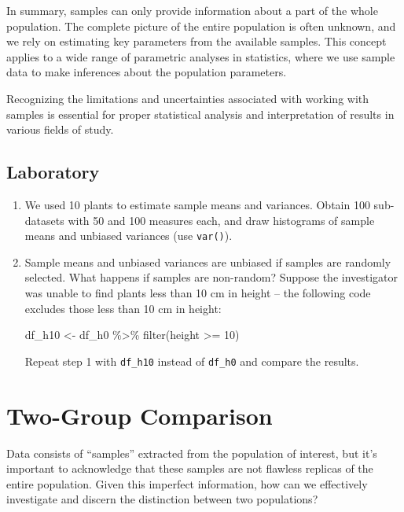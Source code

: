 \documentclass[
]{book}
\newenvironment{Shaded}{\begin{snugshade}}{\end{snugshade}}
\newcommand{\DecValTok}[1]{\textcolor[rgb]{0.00,0.00,0.81}{#1}}
\newcommand{\FunctionTok}[1]{\textcolor[rgb]{0.00,0.00,0.00}{#1}}
\newcommand{\NormalTok}[1]{#1}
\newcommand{\OtherTok}[1]{\textcolor[rgb]{0.56,0.35,0.01}{#1}}
\newcommand{\SpecialCharTok}[1]{\textcolor[rgb]{0.00,0.00,0.00}{#1}}
\begin{document}
In summary, samples can only provide information about a part of the whole population. The complete picture of the entire population is often unknown, and we rely on estimating key parameters from the available samples. This concept applies to a wide range of parametric analyses in statistics, where we use sample data to make inferences about the population parameters.

Recognizing the limitations and uncertainties associated with working with samples is essential for proper statistical analysis and interpretation of results in various fields of study.

\hypertarget{laboratory-1}{%
\section{Laboratory}\label{laboratory-1}}

\begin{enumerate}
\def\labelenumi{\arabic{enumi}.}
\item
  We used 10 plants to estimate sample means and variances. Obtain 100 sub-datasets with 50 and 100 measures each, and draw histograms of sample means and unbiased variances (use \texttt{var()}).
\item
  Sample means and unbiased variances are unbiased if samples are randomly selected. What happens if samples are non-random? Suppose the investigator was unable to find plants less than 10 cm in height -- the following code excludes those less than 10 cm in height:

\begin{Shaded}
\begin{Highlighting}[]
\NormalTok{df\_h10 }\OtherTok{\textless{}{-}}\NormalTok{ df\_h0 }\SpecialCharTok{\%\textgreater{}\%} 
  \FunctionTok{filter}\NormalTok{(height }\SpecialCharTok{\textgreater{}=} \DecValTok{10}\NormalTok{)}
\end{Highlighting}
\end{Shaded}

  Repeat step 1 with \texttt{df\_h10} instead of \texttt{df\_h0} and compare the results.
\end{enumerate}

\hypertarget{two-group-comparison}{%
\chapter{Two-Group Comparison}\label{two-group-comparison}}

Data consists of ``samples'' extracted from the population of interest, but it's important to acknowledge that these samples are not flawless replicas of the entire population. Given this imperfect information, how can we effectively investigate and discern the distinction between two populations?
\end{document}

